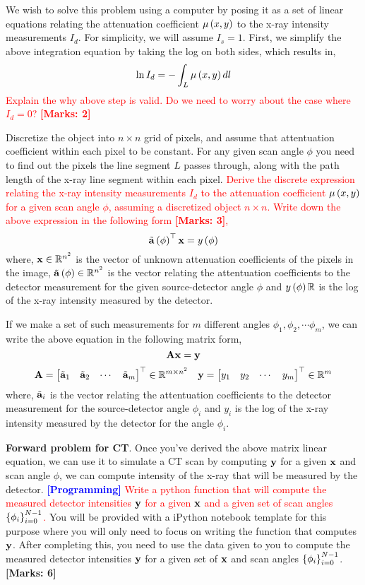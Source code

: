 \documentclass[12pt]{article}
\def\mf{\ensuremath\mathbf}
\def\mb{\ensuremath\mathbb}
\def\lp{\ensuremath\left(}
\def\rp{\ensuremath\right)}
\def\lc{\ensuremath\left\{}
\def\rc{\ensuremath\right\}}
\def\emx{\ensuremath\end{bmatrix*}}
\def\bmxc{\ensuremath\begin{bmatrix*}[c]}
\newcommand{\ct}[1]{\lp #1\rp}
\begin{document}
\begin{enumerate}
We wish to solve this problem using a computer by posing it as a set of linear equations relating the attenuation coefficient $\mu\ct{x,y}$ to the x-ray intensity measurements $I_d$. For simplicity, we will assume $I_s = 1$. First, we simplify the above integration equation by taking the log on both sides, which results in,
\[ \ln I_d = - \int_L \mu \ct{x, y} dl \]
\textcolor{red}{Explain the why above step is valid. Do we need to worry about the case where $I_d = 0$? \textbf{[Marks: 2]}}

Discretize the object into $n \times n$ grid of pixels, and assume that attentuation coefficient within each pixel to be constant. For any given scan angle $\phi$ you need to find out the pixels the line segment $L$ passes through, along with the path length of the x-ray line segment within each pixel. \textcolor{red}{Derive the discrete expression relating the x-ray intensity measurements $I_d$ to the attenuation coefficient $\mu\ct{x,y}$ for a given scan angle $\phi$, assuming a discretized object $n \times n$. Write down the above expression in the following form \textbf{[Marks: 3]},
\[ \tilde{\mf{a}}\ct{\phi}^\top \mf{x} = y\ct{\phi} \]}
where, $\mf{x} \in \mb{R}^{n^2}$ is the vector of unknown attenuation coefficients of the pixels in the image, $\tilde{\mf{a}}\ct{\phi} \in \mb{R}^{n^2}$ is the vector relating the attentuation coefficients to the detector measurement for the given source-detector angle $\phi$ and $y\ct{\phi} \mb{R}$ is the log of the x-ray intensity measured by the detector. 

If we make a set of such measurements for $m$ different angles $\phi_1, \phi_2, \cdots \phi_m$, we can write the above equation in the following matrix form,
\[ \mf{A}\mf{x} = \mf{y} \]
\[ \mf{A} = \bmxc \tilde{\mf{a}}_1 & \tilde{\mf{a}}_2 & \cdots & \tilde{\mf{a}}_m\emx^\top \in \mb{R}^{m \times n^2}\quad \mf{y} = \bmxc y_1 & y_2 & \cdots & y_m\emx^\top \in \mb{R}^{m} \]
where, $\tilde{\mf{a}}_i$ is the vector relating the attentuation coefficients to the detector measurement for the source-detector angle $\phi_i$ and $y_i$ is the log of the x-ray intensity measured by the detector for the angle $\phi_i$.

\textbf{Forward problem for CT}. Once you've derived the above matrix linear equation, we can use it to simulate a CT scan by computing $\mf{y}$ for a given $\mf{x}$ and scan angle $\phi$, we can compute intensity of the x-ray that will be measured by the detector. \textcolor{red}{\textcolor{blue}{\textbf{[Programming]}} Write a python function that will compute the measured detector intensities $\mf{y}$ for a given $\mf{x}$ and a given set of scan angles $\lc \phi_i \rc_{i=0}^{N-1}$.} You will be provided with a iPython notebook template for this purpose where you will only need to focus on writing the function that computes $\mf{y}$. After completing this, you need to use the data given to you to compute the measured detector intensities $\mf{y}$ for a given set of $\mf{x}$ and scan angles $\lc \phi_i \rc_{i=0}^{N-1}$. \textbf{[Marks: 6]}

\end{enumerate}
\end{document}

